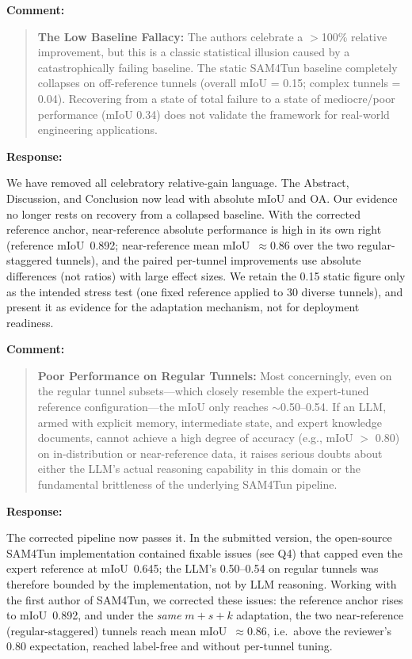 \documentclass[11pt,a4paper]{article}
\newenvironment{commentblock}{%
  \par\smallskip\noindent\textbf{Comment:}\par
  \begin{quote}\itshape\color{black}
}{%
  \end{quote}\smallskip
}
\newenvironment{responseblock}{%
  \par\smallskip\noindent\textbf{Response:}\par
  \begingroup\color{responsegreen}
}{%
  \endgroup\smallskip
}
\begin{document}
\begin{commentblock}
\textbf{The Low Baseline Fallacy:} The authors celebrate a $>$100\% relative improvement, but this is a classic statistical illusion caused by a catastrophically failing baseline. The static SAM4Tun baseline completely collapses on off-reference tunnels (overall mIoU = 0.15; complex tunnels = 0.04). Recovering from a state of total failure to a state of mediocre/poor performance (mIoU 0.34) does not validate the framework for real-world engineering applications.
\end{commentblock}
\begin{responseblock}
We have removed all celebratory relative-gain language. The Abstract, Discussion, and Conclusion now lead with absolute mIoU and OA. Our evidence no longer rests on recovery from a collapsed baseline. With the corrected reference anchor, near-reference absolute performance is high in its own right (reference mIoU~0.892; near-reference mean mIoU~$\approx$0.86 over the two regular-staggered tunnels), and the paired per-tunnel improvements use absolute differences (not ratios) with large effect sizes. We retain the 0.15 static figure only as the intended stress test (one fixed reference applied to 30 diverse tunnels), and present it as evidence for the adaptation mechanism, not for deployment readiness.
\end{responseblock}

\begin{commentblock}
\textbf{Poor Performance on Regular Tunnels:} Most concerningly, even on the regular tunnel subsets---which closely resemble the expert-tuned reference configuration---the mIoU only reaches $\sim$0.50--0.54. If an LLM, armed with explicit memory, intermediate state, and expert knowledge documents, cannot achieve a high degree of accuracy (e.g., mIoU $>$ 0.80) on in-distribution or near-reference data, it raises serious doubts about either the LLM's actual reasoning capability in this domain or the fundamental brittleness of the underlying SAM4Tun pipeline.
\end{commentblock}
\begin{responseblock}
The corrected pipeline now passes it. In the submitted version, the open-source SAM4Tun implementation contained fixable issues (see Q4) that capped even the expert reference at mIoU~0.645; the LLM's 0.50--0.54 on regular tunnels was therefore bounded by the implementation, not by LLM reasoning. Working with the first author of SAM4Tun, we corrected these issues: the reference anchor rises to mIoU~0.892, and under the \emph{same} $m+s+k$ adaptation, the two near-reference (regular-staggered) tunnels reach mean mIoU~$\approx$0.86, i.e.\ above the reviewer's 0.80 expectation, reached label-free and without per-tunnel tuning. 
\end{responseblock}
\end{document}
